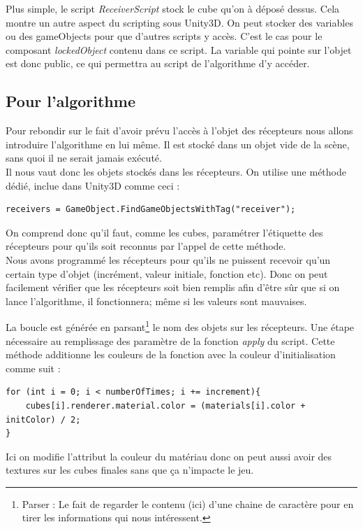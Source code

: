 \documentclass[a4paper,11pt]{myreport}
\begin{document}
	\par Plus simple, le script \textit{ReceiverScript} stock le cube qu'on à déposé dessus. Cela montre un autre aspect du scripting sous Unity3D. On peut stocker des variables ou des gameObjects pour que d'autres scripts y accès. C'est le cas pour le composant  \textit{ lockedObject } contenu dans ce script. La variable qui pointe sur l'objet est donc public, ce qui permettra au script de l'algorithme d'y accéder.
	\subsection{Pour l'algorithme}
	\par Pour rebondir sur le fait d'avoir prévu l'accès à l'objet des récepteurs nous allons introduire l'algorithme en lui même. Il est stocké dans un objet vide de la scène, sans quoi il ne serait jamais exécuté.\\
	Il nous vaut donc les objets stockés dans les récepteurs. On utilise une méthode dédié, inclue dans Unity3D comme ceci :
	\lstset{style=sharpc}
	\begin{lstlisting}
receivers = GameObject.FindGameObjectsWithTag("receiver");
	\end{lstlisting}
	\par On comprend donc qu'il faut, comme les cubes, paramétrer l'étiquette des récepteurs pour qu'ils soit reconnus par l'appel de cette méthode.\\
	Nous avons programmé les récepteurs pour qu'ils ne puissent recevoir qu'un certain type d'objet (incrément, valeur initiale, fonction etc). Donc on peut facilement vérifier que les récepteurs soit bien remplis afin d'être sûr que si on lance l'algorithme, il fonctionnera; même si les valeurs sont mauvaises.
	
	La boucle est générée en parsant\footnote{Parser : Le fait de regarder le contenu (ici) d'une chaine de caractère pour en tirer les informations qui nous intéressent.} le nom des objets sur les récepteurs. Une étape nécessaire au remplissage des paramètre de la fonction \textit{apply} du script. Cette méthode additionne les couleurs de la fonction avec la couleur d'initialisation comme suit : 
	\lstset{style=sharpc}
	\begin{lstlisting}
for (int i = 0; i < numberOfTimes; i += increment){
	cubes[i].renderer.material.color = (materials[i].color + initColor) / 2;
}
	\end{lstlisting}
	\par Ici on modifie l'attribut la couleur du matériau donc on peut aussi avoir des textures sur les cubes finales sans que ça n'impacte le jeu. 
	
\end{document}
